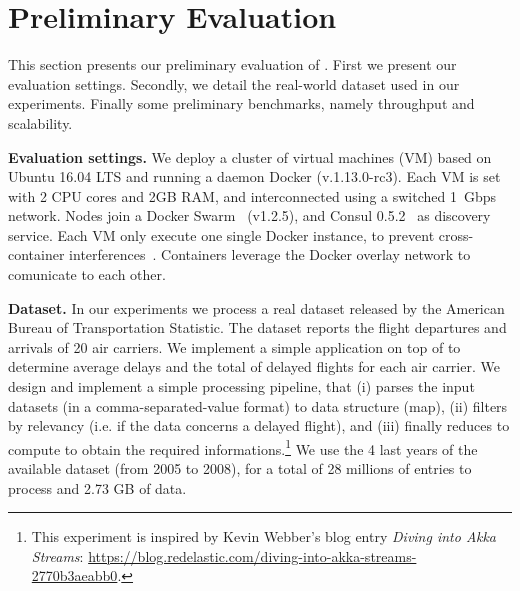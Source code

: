 \section{Preliminary Evaluation}
\label{sec:eval}

This section presents our preliminary evaluation of \SYS.
First we present our evaluation settings.
Secondly, we detail the real-world dataset used in our experiments.
Finally some preliminary benchmarks, namely throughput and scalability.

\textbf{Evaluation settings.} We deploy a cluster of virtual machines (VM) based on Ubuntu 16.04 LTS and running a daemon Docker (v.1.13.0-rc3).
Each VM is set with 2 CPU cores and 2GB RAM, and interconnected using a switched 1~Gbps network.
Nodes join a Docker Swarm~\cite{docker:swarm_2016} (v1.2.5), and Consul 0.5.2~\cite{consul} as discovery service.
Each VM only execute one single Docker instance, to prevent cross-container interferences~\cite{koh2007analysis}.
Containers leverage the Docker overlay network to comunicate to each other.

\textbf{Dataset.} In our experiments we process a real dataset released by the American Bureau of Transportation Statistic\cite{rita:bts}.
The dataset reports the flight departures and arrivals of 20 air carriers\cite{statistical_computing:data}.%
We implement a simple application on top of \SYS to determine average delays and the total of delayed flights for each air carrier.
We design and implement a simple processing pipeline, that (i) parses the input datasets (in a comma-separated-value format) to data structure (map), (ii) filters by relevancy (i.e. if the data concerns a delayed flight), and (iii) finally reduces to compute to obtain the required informations.\footnote{This experiment is inspired by Kevin Webber's blog entry \emph{Diving into Akka Streams}: \url{https://blog.redelastic.com/diving-into-akka-streams-2770b3aeabb0}.}
We use the 4 last years of the available dataset (from 2005 to 2008), for a total of 28 millions of entries to process and 2.73 GB of data.

